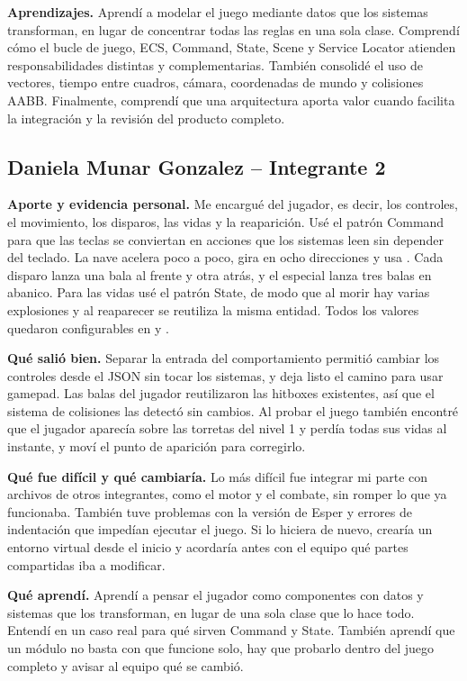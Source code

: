 \documentclass[12pt,letterpaper]{report}
\newcommand{\archivo}[1]{\texttt{\detokenize{#1}}}
\begin{document}
\textbf{Aprendizajes.} Aprendí a modelar el juego mediante datos que los sistemas transforman, en lugar de concentrar todas las reglas en una sola clase. Comprendí cómo el bucle de juego, ECS, Command, State, Scene y Service Locator atienden responsabilidades distintas y complementarias. También consolidé el uso de vectores, tiempo entre cuadros, cámara, coordenadas de mundo y colisiones AABB. Finalmente, comprendí que una arquitectura aporta valor cuando facilita la integración y la revisión del producto completo.

\subsection*{Daniela Munar Gonzalez -- Integrante 2}
\textbf{Aporte y evidencia personal.} Me encargué del jugador, es decir, los controles, el movimiento, los disparos, las vidas y la reaparición. Usé el patrón Command para que las teclas se conviertan en acciones que los sistemas leen sin depender del teclado. La nave acelera poco a poco, gira en ocho direcciones y usa \archivo{delta_time}. Cada disparo lanza una bala al frente y otra atrás, y el especial lanza tres balas en abanico. Para las vidas usé el patrón State, de modo que al morir hay varias explosiones y al reaparecer se reutiliza la misma entidad. Todos los valores quedaron configurables en \archivo{player.json} y \archivo{bullet.json}.

\textbf{Qué salió bien.} Separar la entrada del comportamiento permitió cambiar los controles desde el JSON sin tocar los sistemas, y deja listo el camino para usar gamepad. Las balas del jugador reutilizaron las hitboxes existentes, así que el sistema de colisiones las detectó sin cambios. Al probar el juego también encontré que el jugador aparecía sobre las torretas del nivel 1 y perdía todas sus vidas al instante, y moví el punto de aparición para corregirlo.

\textbf{Qué fue difícil y qué cambiaría.} Lo más difícil fue integrar mi parte con archivos de otros integrantes, como el motor y el combate, sin romper lo que ya funcionaba. También tuve problemas con la versión de Esper y errores de indentación que impedían ejecutar el juego. Si lo hiciera de nuevo, crearía un entorno virtual desde el inicio y acordaría antes con el equipo qué partes compartidas iba a modificar.

\textbf{Qué aprendí.} Aprendí a pensar el jugador como componentes con datos y sistemas que los transforman, en lugar de una sola clase que lo hace todo. Entendí en un caso real para qué sirven Command y State. También aprendí que un módulo no basta con que funcione solo, hay que probarlo dentro del juego completo y avisar al equipo qué se cambió.
\end{document}
